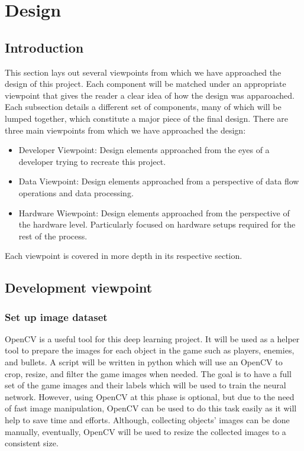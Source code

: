 \documentclass{scrreprt}
\begin{document}
\chapter{Design}

\section{Introduction}

This section lays out several viewpoints from which we have approached the design of this project.
Each component will be matched under an appropriate viewpoint that gives the reader a clear idea of how the design was apparoached.
Each subsection details a different set of components, many of which will be lumped together, which constitute a major piece of the final design.
There are three main viewpoints from which we have approached the design:
\begin{itemize}
  \item Developer Viewpoint: Design elements approached from the eyes of a developer trying to recreate this project.

  \item Data Viewpoint: Design elements approached from a perspective of data flow operations and data processing.

  \item Hardware Wiewpoint: Design elements approached from the perspective of the hardware level. Particularly focused on hardware setups required for the rest of the process.
\end{itemize}

Each viewpoint is covered in more depth in its respective section.

\section{Development viewpoint}%

\subsection{Set up image dataset}%

OpenCV is a useful tool for this deep learning project.
It will be used as a helper tool to prepare the images for each object in the game such as players, enemies, and bullets.
A script will be written in python which will use an OpenCV to crop, resize, and filter the game images when needed.
The goal is to have a full set of the game images and their labels which will be used to train the neural network.
However, using OpenCV at this phase is optional, but due to the need of fast image manipulation, OpenCV can be used to do this task easily as it will help to save time and efforts.
Although, collecting objects’ images can be done manually, eventually, OpenCV will be used to resize the collected images to a consistent size.
\end{document}
